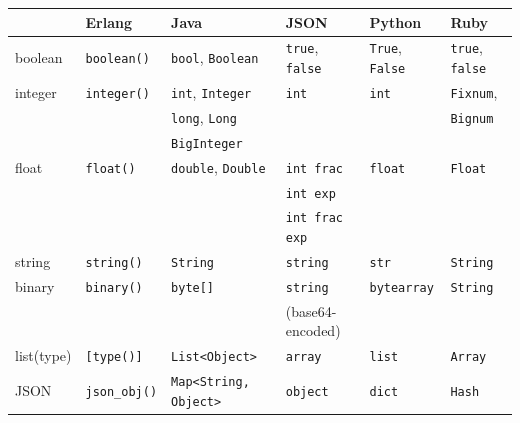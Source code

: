 \documentclass[a4paper]{scrreprt}
\newcommand{\code}[1]{\lstinline[basicstyle=\ttfamily]!#1!}
\begin{document}
\begin{table}
  \centering
  \begin{threeparttable}[b]
    \begin{tabular}{llllll}
    \toprule
               & Erlang            & Java                         & JSON                            & Python                    & Ruby \\
    \midrule
    boolean    & \code{boolean()}  & \code{bool}, \code{Boolean}  & \code{true}, \code{false}       & \code{True}, \code{False} & \code{true}, \code{false} \\
    integer    & \code{integer()}  & \code{int}, \code{Integer}   & \code{int}                      & \code{int}                & \code{Fixnum}, \\
               &                   & \code{long}, \code{Long}     &                                 &                           & \code{Bignum} \\
               &                   & \code{BigInteger}            &                                 &                           & \\
    float      & \code{float()}    & \code{double}, \code{Double} & \code{int frac}                 & \code{float}              & \code{Float} \\
               &                   &                              & \code{int exp}                  &                           & \\
               &                   &                              & \code{int frac exp}             &                           & \\
    string     & \code{string()}   & \code{String}                & \code{string}                   & \code{str}                & \code{String} \\
    binary     & \code{binary()}   & \code{byte[]}                & \code{string}                   & \code{bytearray}          & \code{String} \\
               &                   &                              & \footnotesize{(base64-encoded)} &                           & \\
    list(type) & \code{[type()]}   & \code{List<Object>}          & \code{array}                    & \code{list}               & \code{Array} \\
    JSON       & \code{json_obj()}\tnote{*} & \code{Map<String, Object>} & \code{object}            & \code{dict}               & \code{Hash}\\

\end{tabular}
\end{threeparttable}
\end{table}
\end{document}

